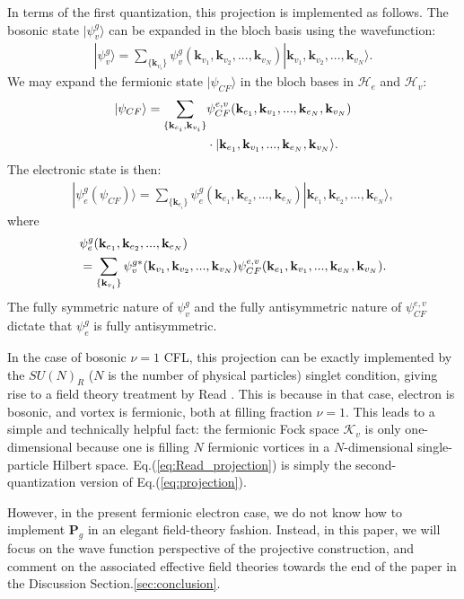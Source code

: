 In terms of the first quantization, this projection is implemented as follows. The bosonic state $|\psi_v^g\rangle$ can be expanded in the bloch basis using the wavefunction:
\begin{align}
|\psi_v^g\rangle=\sum_{\{\mathbf k_{v_i}\}} \psi_v^g(\mathbf k_{v_1},\mathbf k_{v_2},...,\mathbf k_{v_N}) |\mathbf k_{v_1},\mathbf k_{v_2},...,\mathbf k_{v_N}\rangle.
\end{align}
We may expand the fermionic state $|\psi_{CF}\rangle$ in the bloch bases in $\mathcal H_e$ and $\mathcal H_v$:
\begin{align}
|\psi_{CF}\rangle=\sum_{\{\mathbf k_{e_i},\mathbf k_{v_i}\}} &\psi^{e,v}_{CF}(\mathbf k_{e_1},\mathbf k_{v_1},...,\mathbf k_{e_N},\mathbf k_{v_N}) \notag\\
&\cdot|\mathbf k_{e_1},\mathbf k_{v_1},...,\mathbf k_{e_N},\mathbf k_{v_N}\rangle.
\end{align}
The electronic state is then:
\begin{align}
|\psi^g_e(\psi_{CF})\rangle=\sum_{\{\mathbf k_{e_i}\}} \psi_e^g(\mathbf k_{e_1},\mathbf k_{e_2},...,\mathbf k_{e_N}) |\mathbf k_{e_1},\mathbf k_{e_2},...,\mathbf k_{e_N}\rangle,
\end{align}
where
\begin{align}
 &\psi_e^g(\mathbf k_{e_1},\mathbf k_{e_2},...,\mathbf k_{e_N})\notag\\
 &=\sum_{\{\mathbf k_{v_i}\}}\psi_v^{g*}(\mathbf k_{v_1},\mathbf k_{v_2},...,\mathbf k_{v_N})\psi^{e,v}_{CF}(\mathbf k_{e_1},\mathbf k_{v_1},...,\mathbf k_{e_N},\mathbf k_{v_N}).\label{eq:projection}
\end{align}
The fully symmetric nature of $\psi_v^g$ and the fully antisymmetric nature of $\psi^{e,v}_{CF}$ dictate that $\psi_e^g$ is fully antisymmetric.

In the case of bosonic $\nu=1$ CFL, this projection can be exactly implemented by the $SU(N)_R$ ($N$ is the number of physical particles) singlet condition, giving rise to a field theory treatment by Read \cite{read1998lowest}. This is because in that case, electron is bosonic, and vortex is fermionic, both at filling fraction $\nu=1$. This leads to a simple and technically helpful fact: the fermionic Fock space $\mathcal K_v$ is only one-dimensional because one is filling $N$ fermionic vortices in a $N$-dimensional single-particle Hilbert space. Eq.(\ref{eq:Read_projection}) is simply the second-quantization version of Eq.(\ref{eq:projection}).

However, in the present fermionic electron case, we do not know how to implement $\mathbf P_g$ in an elegant field-theory fashion. Instead, in this paper, we will focus on the wave function perspective of the projective construction, and comment on the associated effective field theories towards the end of the paper in the Discussion Section.\ref{sec:conclusion}.

